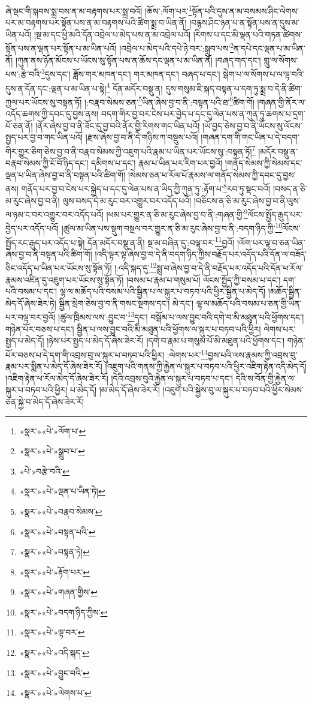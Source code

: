 ཞེ་སྡང་གི་སྐབས་སྨྲ་བས་ན་མ་བརྟགས་པར་སྨྲ་བའོ། །ཆོས་:ལོག་པར་\footnote{«སྣར་»«པེ་»ལོག་པ་}སྟོན་པའི་དུས་ན་མ་བསམས་ཤིང་ལེགས་པར་མ་བརྟགས་པར་སྟོན་པས་ན་མ་བརྟགས་པའི་ཚིག་སྨྲ་བ་ཡིན་ནོ། །བརྙས་ཤིང་ཉན་པ་ན་སྟོན་པས་ན་དུས་མ་ཡིན་པའོ། །སྔ་མ་དང་ཕྱི་མའི་དོན་འབྲེལ་པ་མེད་པས་ན་མ་འབྲེལ་པའོ། །རིགས་པ་དང་མི་ལྡན་པའི་གཏན་ཚིགས་སྟོན་པས་ན་ལྡན་པར་སྟོན་པ་མ་ཡིན་པའོ། །འབྲེལ་པ་མེད་པའི་དཔེ་ཉེ་བར་:སྒྲུབ་པས་\footnote{«སྣར་»«པེ་»སྒྲུབ་པ་}ན་དཔེ་དང་ལྡན་པ་མ་ཡིན་ནོ། །ཀུན་ནས་ཉོན་མོངས་པ་ཡོངས་སུ་སྟོན་པས་ན་ཆོས་དང་ལྡན་པ་མ་ཡིན་ནོ། །བཞད་གད་དང་། གླུ་ལ་སོགས་པས་:རྩེ་བའི་\footnote{«པེ་»བརྩེ་བའི་}དུས་དང་། ཟློས་གར་མཁན་དང་། གར་མཁན་དང་། བཞད་པ་དང་། སྒེག་པ་ལ་སོགས་པ་ལ་ལྟ་བའི་དུས་ན་དོན་དང་:ལྡན་པ་མ་ཡིན་པ་སྟེ།\footnote{«སྣར་»«པེ་»ལྡན་པ་ཡིན་ཏེ།} དོན་མདོར་བསྡུ་ན། དུས་གསུམ་ཇི་སྐད་བསྟན་པ་དག་ཏུ་སྨྲ་བ་དེ་ནི་ཚིག་ཀྱལ་པར་ཡོངས་སུ་བསྟན་ཏོ། །:བརྣབ་སེམས་ཅན་\footnote{«སྣར་»«པེ་»བརྣབ་སེམས་}ཡིན་ཞེས་བྱ་བ་ནི་:བསྟན་པའི་ཐ་\footnote{«སྣར་»«པེ་»བསྟན་པའི་}ཚིག་གོ། །གཞན་གྱི་ནོར་ལ་འདོད་ཆགས་ཀྱི་དབང་དུ་བྱས་ནས། བདག་གིར་བྱ་བར་ངེས་པར་བྱེད་པ་དང་དུ་ལེན་པས་ན་ཀུན་ཏུ་ཆགས་པ་དྲག་པོ་ཅན་ནོ། །ནོར་ཞེས་བྱ་བ་ནི་ཟོང་དུ་བྱ་བའི་ནོར་གྱི་རིགས་གང་ཡིན་པའོ། །ཡོ་བྱད་ཅེས་བྱ་བ་ནི་ཡོངས་སུ་ལོངས་སྤྱད་པར་བྱ་བ་གང་ཡིན་པའོ། །རྫས་ཞེས་བྱ་བ་ནི་དེ་གཉིས་ཀ་བསྡུས་པའོ། །གཞན་དག་གི་གང་ཡིན་པ་དེ་བདག་གིར་གྱུར་ཅིག་ཅེས་བྱ་བ་ནི་བརྣབ་སེམས་ཀྱི་འཇུག་པའི་རྣམ་པ་ཡིན་པར་ཡོངས་སུ་:བསྟན་ཏོ།\footnote{«སྣར་»«པེ་»བསྟན་ཏེ།} །མདོར་བསྡུ་ན་བརྣབ་སེམས་ཀྱི་ངོ་བོ་ཉིད་དང་། དམིགས་པ་དང་། རྣམ་པ་ཡིན་པར་རིག་པར་བྱའོ། །གནོད་སེམས་ཀྱི་སེམས་དང་ལྡན་པ་ཡིན་ཞེས་བྱ་བ་ནི་བསྟན་པའི་ཚིག་གོ། །སེམས་ཅན་ཕ་རོལ་པོ་རྣམས་ལ་གནོད་སེམས་ཀྱི་དབང་དུ་བྱས་ནས། གནོད་པར་བྱ་བ་ངེས་པར་སྐྱེད་པ་དང་དུ་ལེན་པས་ན་ཡིད་ཀྱི་ཀུན་ཏུ་:རྟོག་པ་\footnote{«སྣར་»«པེ་»རྟོག་པར་}རབ་ཏུ་སྡང་བའོ། །བསད་ན་ཅི་མ་རུང་ཞེས་བྱ་བ་ནི། ལུས་བསད་དེ་མ་རུང་བར་འགྱུར་བར་འདོད་པའོ། །བཅིངས་ན་ཅི་མ་རུང་ཞེས་བྱ་བ་ནི་ལུས་ལ་ཉམ་ང་བར་འགྱུར་བར་འདོད་པའོ། །ཕམ་པར་གྱུར་ན་ཅི་མ་རུང་ཞེས་བྱ་བ་ནི་:གཞན་གྱི་\footnote{«སྣར་»«པེ་»གཞན་གྱིས་}ལོངས་སྤྱོད་རྒུད་པར་བྱེད་པར་འདོད་པའོ། །ཚུལ་མ་ཡིན་པས་སྡུག་བསྔལ་བར་གྱུར་ན་ཅི་མ་རུང་ཞེས་བྱ་བ་ནི་:བདག་ཉིད་ཀྱི་\footnote{«སྣར་»«པེ་»བདག་ཉིད་ཀྱིས་}ལོངས་སྤྱོད་རང་རྒུད་པར་འདོད་པ་སྟེ། དོན་མདོར་བསྡུ་ན་ནི། སྔ་མ་བཞིན་དུ་:བལྟ་བར་\footnote{«སྣར་»«པེ་»ལྟ་བར་}བྱའོ། །ལོག་པར་ལྟ་བ་ཅན་ཡིན་ཞེས་བྱ་བ་ནི་བསྟན་པའི་ཚིག་གོ། །འདི་ལྟར་ལྟ་ཞེས་བྱ་བ་དེ་ནི་བདག་ཉིད་ཀྱིས་བརྗོད་པར་འདོད་པའི་དོན་ལ་བཟོད་ཅིང་འདོད་པ་ཡིན་པར་ཡོངས་སུ་སྟོན་ཏོ། །:འདི་སྐད་དུ་\footnote{«སྣར་»«པེ་»འདི་སྐད་}སྨྲ་བ་ཞེས་བྱ་བ་དེ་ནི་བརྗོད་པར་འདོད་པའི་དོན་ཕ་རོལ་རྣམས་འཛིན་དུ་འཇུག་པར་ཡོངས་སུ་སྟོན་ཏོ། །བསམ་པ་རྣམ་པ་གསུམ་པོ། ལོངས་སྤྱོད་ཀྱི་བསམ་པ་དང་། དག་པའི་བསམ་པ་དང་། ལྷ་ལ་མཆོད་པའི་བསམ་པའི་སྦྱིན་པ་ལ་སྐུར་པ་བཏབ་པའི་ཕྱིར་སྦྱིན་པ་མེད་དོ། །མཆོད་སྦྱིན་མེད་དོ་ཞེས་ཟེར་ཏེ། སྦྱིན་སྲེག་ཅེས་བྱ་བ་ནི་གསང་སྔགས་དང་། མེ་དང་། ལྷ་ལ་མཆོད་པའི་བསམ་པ་ཅན་གྱི་ཡིན་པར་བལྟ་བར་བྱའོ། །ཚུལ་ཁྲིམས་ལས་:བྱུང་བ་\footnote{«སྣར་»«པེ་»བྱུང་བའི་}དང་། བསྒོམ་པ་ལས་བྱུང་བའི་དགེ་བ་མི་མཐུན་པའི་ཕྱོགས་དང་། གཉེན་པོར་བཅས་པ་དང་། སྦྱིན་པ་ལས་བྱུང་བའི་མི་མཐུན་པའི་ཕྱོགས་ལ་སྐུར་པ་བཏབ་པའི་ཕྱིར། ལེགས་པར་སྤྱད་པ་མེད་དོ། །ཉེས་པར་སྤྱད་པ་མེད་དོ་ཞེས་ཟེར་རོ། །དགེ་བ་རྣམ་པ་གསུམ་པོ་མི་མཐུན་པའི་ཕྱོགས་དང་། གཉེན་པོར་བཅས་པ་དེ་དག་གི་འབྲས་བུ་ལ་སྐུར་པ་བཏབ་པའི་ཕྱིར། :ལེགས་པར་\footnote{«སྣར་»«པེ་»ལེགས་པ་}བྱས་པའི་ལས་རྣམས་ཀྱི་འབྲས་བུ་རྣམ་པར་སྨིན་པ་མེད་དོ་ཞེས་ཟེར་རོ། །འཇུག་པའི་གནས་ཀྱི་རྐྱེན་ལ་སྐུར་པ་བཏབ་པའི་ཕྱིར་འཇིག་རྟེན་འདི་མེད་དོ། །འཇིག་རྟེན་ཕ་རོལ་མེད་དོ་ཞེས་ཟེར་རོ། །དེའི་འབྲས་བུའི་རྐྱེན་ལ་སྐུར་པ་བཏབ་པ་དང་། དེའི་ས་བོན་གྱི་རྐྱེན་ལ་སྐུར་པ་བཏབ་པའི་ཕྱིར། པ་མེད་དོ། །མ་མེད་དོ་ཞེས་ཟེར་རོ། །འཇུག་པའི་སྐྱེས་བུ་ལ་སྐུར་པ་བཏབ་པའི་ཕྱིར་སེམས་ཅན་སྐྱེ་བ་མེད་དོ་ཞེས་ཟེར་རོ། 
